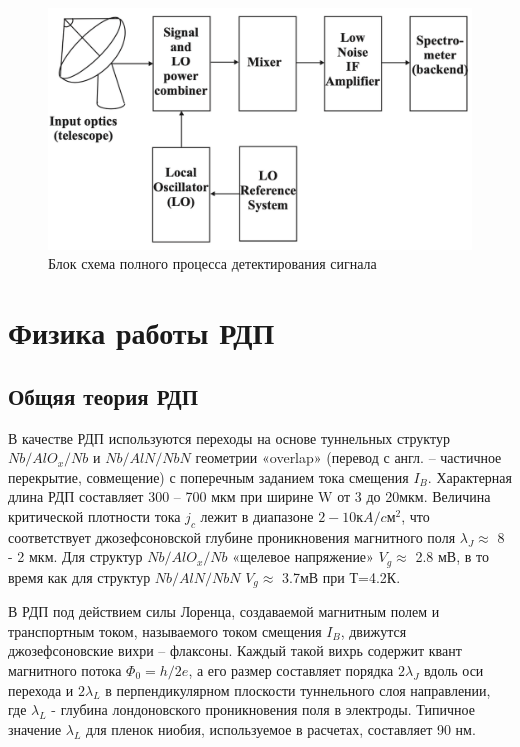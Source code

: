 \documentclass[12pt,a4paper]{article}
\begin{document}
\begin{figure}[H]
    \centering
    \includegraphics[scale = 0.8]{block-scheme.png}
    \caption{Блок схема полного процесса детектирования сигнала}
    \label{shem}
\end{figure}

\newpage

\section{Физика работы РДП}

\subsection{Общяя теория РДП}

В качестве РДП используются переходы на основе туннельных структур $Nb/AlO_x/Nb$ и $Nb/AlN/NbN$ геометрии «overlap» (перевод с англ. – частичное перекрытие, совмещение) с поперечным заданием тока смещения $I_B$. Характерная длина РДП составляет 300 – 700 мкм при ширине W от 3 до 20мкм. Величина критической плотности тока $j_c$ лежит в диапазоне $2-10кA/cм^2$, что соответствует джозефсоновской глубине проникновения магнитного поля $\lambda_J \approx$ 8 - 2 мкм. Для структур $Nb/AlO_x/Nb$ «щелевое напряжение» $V_g \approx$ 2.8 мВ, в то время как для структур $Nb/AlN/NbN$ $V_g \approx$ 3.7мВ при Т=4.2К. \par 

В РДП под действием силы Лоренца, создаваемой магнитным полем и транспортным током, называемого током смещения $I_B$, движутся джозефсоновские вихри – флаксоны. Каждый такой вихрь содержит квант магнитного потока $\varPhi_0 = h/2e$, а его размер составляет порядка $2\lambda_J$ вдоль оси перехода и $2\lambda_L$ в перпендикулярном плоскости туннельного слоя направлении, где $\lambda_L$ - глубина лондоновского проникновения поля в электроды. Типичное значение $\lambda_L$ для пленок ниобия, используемое в расчетах, составляет 90 нм. 
\end{document}

